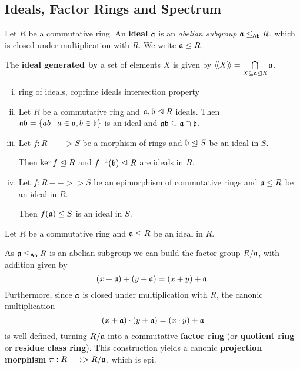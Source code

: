 	\subsection{Ideals, Factor Rings and Spectrum}
	\begin{definition}
		Let $R$ be a commutative ring. An \textbf{ideal} $\mathfrak{a}$ is an \textit{abelian subgroup} $\mathfrak{a} \leq_{\textsf{Ab}} R$, which is closed under multiplication with $R$. We write $\mathfrak{a} \trianglelefteq R$.

		The \textbf{ideal generated by} a set of elements $X$ is given by $\langle\!\langle X \rangle\!\rangle = \bigcap \limits_{X \subseteq \mathfrak{a} \trianglelefteq R} \mathfrak{a}$.
	\end{definition}

	\begin{lemma}
		\vspace{-1.5em}\begin{enumerate}[(i)]
			\item{ring of ideals, coprime ideals intersection property}
			\item{
				Let $R$ be a commutative ring and $\mathfrak{a},\mathfrak{b} \trianglelefteq R$ ideals. Then $\mathfrak{ab} = \{ab \mid a \in \mathfrak{a}, b \in \mathfrak{b}\}$ is an ideal and $\mathfrak{ab} \subseteq \mathfrak{a} \cap \mathfrak{b}$.
			}
			\item{
				Let $f:R --> S$ be a morphism of rings and $\mathfrak{b} \trianglelefteq S$ be an ideal in $S$.

				Then $\ker f \trianglelefteq R$ and $f^{-1}(\mathfrak{b}) \trianglelefteq R$ are ideals in $R$.
			}
			\item{
				Let $f:R -->> S$ be an epimorphism of commutative rings and $\mathfrak{a} \trianglelefteq R$ be an ideal in $R$.

				Then $f(\mathfrak{a}) \trianglelefteq S$ is an ideal in $S$.
			}
		\end{enumerate}
	\end{lemma}

	\begin{definition}
		Let $R$ be a commutative ring and $\mathfrak{a} \trianglelefteq R$ be an ideal in $R$. 

		As $\mathfrak{a} \leq_{\textsf{Ab}} R$ is an abelian subgroup we can build the factor group $R/\mathfrak{a}$, with addition given by
		\begin{equation*}
			(x + \mathfrak{a}) + (y + \mathfrak{a}) = (x+y) + \mathfrak{a}.
		\end{equation*}
		Furthermore, since $\mathfrak{a}$ is closed under multiplication with $R$, the canonic multiplication
		\begin{equation*}
			(x + \mathfrak{a}) \cdot (y + \mathfrak{a}) = (x \cdot y) + \mathfrak{a}
		\end{equation*}
		is well defined, turning $R / \mathfrak{a}$ into a commutative \textbf{factor ring} (or \textbf{quotient ring} or \textbf{residue class ring}). This construction yields a canonic \textbf{projection morphism} $\pi: R -->> R/\mathfrak{a}$, which is epi.
	\end{definition}

